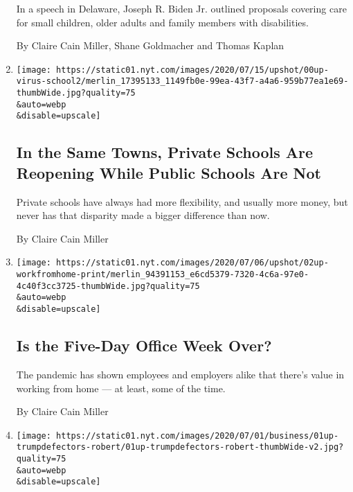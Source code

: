 \begin{enumerate}
  In a speech in Delaware, Joseph R. Biden Jr. outlined proposals
  covering care for small children, older adults and family members with
  disabilities.

  By Claire Cain Miller, Shane Goldmacher and Thomas Kaplan
\item
  \href{/2020/07/16/upshot/coronavirus-school-reopening-private-public-gap.html}{}

  \texttt{[image: https://static01.nyt.com/images/2020/07/15/upshot/00up-virus-school2/merlin\_17395133\_1149fb0e-99ea-43f7-a4a6-959b77ea1e69-thumbWide.jpg?quality=75\\\&auto=webp\\\&disable=upscale]}

  \hypertarget{in-the-same-towns-private-schools-are-reopening-while-public-schools-are-not}{%
  \subsection{In the Same Towns, Private Schools Are Reopening While
  Public Schools Are
  Not}\label{in-the-same-towns-private-schools-are-reopening-while-public-schools-are-not}}

  Private schools have always had more flexibility, and usually more
  money, but never has that disparity made a bigger difference than now.

  By Claire Cain Miller
\item
  \href{/2020/07/02/upshot/is-the-five-day-office-week-over.html}{}

  \texttt{[image: https://static01.nyt.com/images/2020/07/06/upshot/02up-workfromhome-print/merlin\_94391153\_e6cd5379-7320-4c6a-97e0-4c40f3cc3725-thumbWide.jpg?quality=75\\\&auto=webp\\\&disable=upscale]}

  \hypertarget{is-the-five-day-office-week-over}{%
  \subsection{Is the Five-Day Office Week
  Over?}\label{is-the-five-day-office-week-over}}

  The pandemic has shown employees and employers alike that there's
  value in working from home --- at least, some of the time.

  By Claire Cain Miller
\item
  \href{/2020/07/01/upshot/poll-trump-defectors-2020-election.html}{}

  \texttt{[image: https://static01.nyt.com/images/2020/07/01/business/01up-trumpdefectors-robert/01up-trumpdefectors-robert-thumbWide-v2.jpg?quality=75\\\&auto=webp\\\&disable=upscale]}


\end{enumerate}
